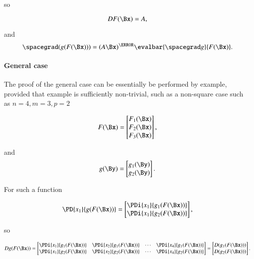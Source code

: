 so

\begin{dmath}\label{eqn:jacobianAndHessian:824}
D F(\Bx) = A,
\end{dmath}

and
\begin{dmath}\label{eqn:jacobianAndHessian:n}
\spacegrad (g(F(\Bx)))
=
(A \Bx)^\T
\evalbar{\spacegrad g}{F(\Bx)}.
\end{dmath}

\paragraph{General case}

The proof of the general case
can be essentially be performed by example, provided that example is sufficiently non-trivial, such as
a non-square case such as \( n = 4, m = 3, p = 2 \)

\begin{dmath}\label{eqn:jacobianAndHessian:924}
F(\Bx) =
\begin{bmatrix}
F_1(\Bx) \\
F_2(\Bx) \\
F_3(\Bx) \\
\end{bmatrix},
\end{dmath}

and
\begin{dmath}\label{eqn:jacobianAndHessian:944}
g(\By)
=
\begin{bmatrix}
g_1(\By) \\
g_2(\By) \\
\end{bmatrix}.
\end{dmath}

For such a function

\begin{dmath}\label{eqn:jacobianAndHessian:964}
\PD{x_1}{g(F(\Bx))}
=
\begin{bmatrix}
\PDi{x_1}{g_1(F(\Bx))} \\
\PDi{x_1}{g_2(F(\Bx))}
\end{bmatrix},
\end{dmath}

so

\begin{dmath}\label{eqn:jacobianAndHessian:984}
D g(F(\Bx))
=
\begin{bmatrix}
\PDi{x_1}{g_1(F(\Bx))} & \PDi{x_2}{g_1(F(\Bx))} & \cdots & \PDi{x_4}{g_1(F(\Bx))} \\
\PDi{x_1}{g_2(F(\Bx))} & \PDi{x_2}{g_2(F(\Bx))} & \cdots & \PDi{x_4}{g_2(F(\Bx))} \\
\end{bmatrix}
=
\begin{bmatrix}
D (g_1(F(\Bx))) \\
D (g_2(F(\Bx))) \\
\end{bmatrix}.
\end{dmath}

